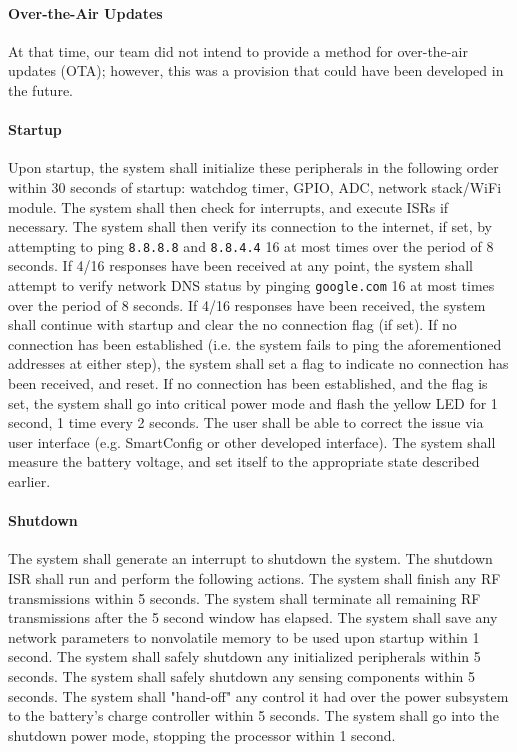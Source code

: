 \paragraph{Over-the-Air Updates}
At that time, our team did not intend to provide a method for over-the-air updates (OTA); however, this was a provision that could have been developed in the future.

\paragraph{Startup} Upon startup, the system shall initialize these peripherals in the following order within 30 seconds of startup: watchdog timer, GPIO, ADC, network stack/WiFi module. The system shall then check for interrupts, and execute ISRs if necessary. The system shall then verify its connection to the internet, if set, by attempting to ping \texttt{8.8.8.8} and \texttt{8.8.4.4} 16 at most times over the period of 8 seconds. If 4/16 responses have been received at any point, the system shall attempt to verify network DNS status by pinging \texttt{google.com} 16 at most times over the period of 8 seconds. If 4/16 responses have been received, the system shall continue with startup and clear the no connection flag (if set). If no connection has been established (i.e. the system fails to ping the aforementioned addresses at either step), the system shall set a flag to indicate no connection has been received, and reset. If no connection has been established, and the flag is set, the system shall go into critical power mode and flash the yellow LED for 1 second, 1 time every 2 seconds. The user shall be able to correct the issue via user interface (e.g. SmartConfig or other developed interface). The system shall measure the battery voltage, and set itself to the appropriate state described earlier.

\paragraph{Shutdown} The system shall generate an interrupt to shutdown the system. The shutdown ISR shall run and perform the following actions. The system shall finish any RF transmissions within 5 seconds. The system shall terminate all remaining RF transmissions after the 5 second window has elapsed. The system shall save any network parameters to nonvolatile memory to be used upon startup within 1 second. The system shall safely shutdown any initialized peripherals within 5 seconds. The system shall safely shutdown any sensing components within 5 seconds. The system shall "hand-off" any control it had over the power subsystem to the battery's charge controller within 5 seconds. The system shall go into the shutdown power mode, stopping the processor within 1 second.

